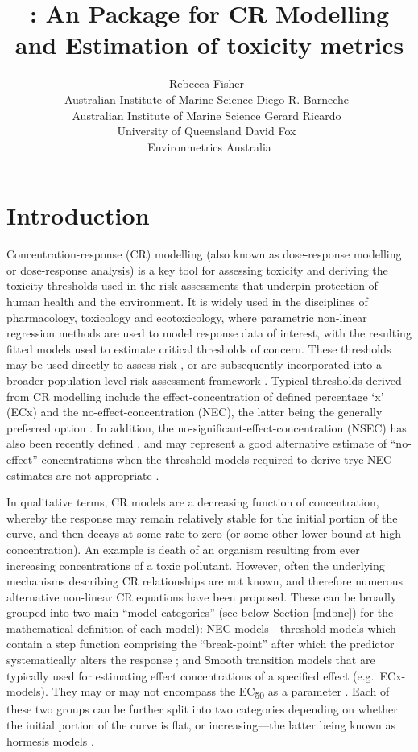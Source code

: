 \documentclass[
  shortnames]{jss}
\author{
Rebecca Fisher~\orcidlink{0000-0001-5148-6731}\\Australian Institute of Marine Science \And Diego R. Barneche~\orcidlink{0000-0002-4568-2362}\\Australian Institute of Marine Science \And Gerard Ricardo~\orcidlink{0000-0002-7761-0806}\\University of Queensland \And David Fox~\orcidlink{0000-0002-3178-7243}\\Environmetrics Australia
}
\title{\pkg{bayesnec}: An \proglang{R} Package for CR Modelling and Estimation of toxicity metrics}
\begin{document}
\hypertarget{introduction}{%
\section{Introduction}\label{introduction}}

Concentration-response (CR) modelling (also known as dose-response modelling or dose-response analysis) is a key tool for assessing toxicity and deriving the toxicity thresholds used in the risk assessments that underpin protection of human health and the environment. It is widely used in the disciplines of pharmacology, toxicology and ecotoxicology, where parametric non-linear regression methods are used to model response data of interest, with the resulting fitted models used to estimate critical thresholds of concern. These thresholds may be used directly to assess risk \citep[e.g see][]{fisher2018c}, or are subsequently incorporated into a broader population-level risk assessment framework \citep[e.g.][]{Warne2015}. Typical thresholds derived from CR modelling include the effect-concentration of defined percentage `x' (ECx) and the no-effect-concentration (NEC), the latter being the generally preferred option \citep{Fox2008, Warne2015, Warne2018c}. In addition, the no-significant-effect-concentration (NSEC) has also been recently defined \citep{Fisher2023}, and may represent a good alternative estimate of ``no-effect'' concentrations when the threshold models required to derive trye NEC estimates are not appropriate \citep{Fisher2023, fisher2023ieam}.

In qualitative terms, CR models are a decreasing function of concentration, whereby the response may remain relatively stable for the initial portion of the curve, and then decays at some rate to zero (or some other lower bound at high concentration). An example is death of an organism resulting from ever increasing concentrations of a toxic pollutant. However, often the underlying mechanisms describing CR relationships are not known, and therefore numerous alternative non-linear CR equations have been proposed. These can be broadly grouped into two main ``model categories'' (see below Section \ref{mdbnc}) for the mathematical definition of each model): NEC models---threshold models which contain a step function comprising the ``break-point'' after which the predictor systematically alters the response \citep{Fox2010}; and Smooth transition models that are typically used for estimating effect concentrations of a specified effect (e.g.~ECx- models). They may or may not encompass the EC\textsubscript{50} as a parameter \citep{Ritz2016}. Each of these two groups can be further split into two categories depending on whether the initial portion of the curve is flat, or increasing---the latter being known as hormesis models \citep{Ritz2016}.
\end{document}
